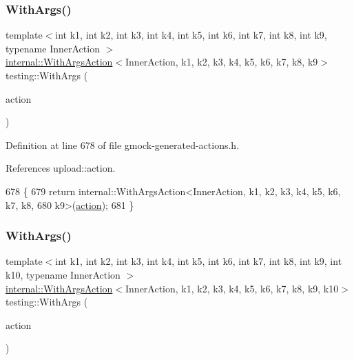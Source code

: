 \subsubsection{\texorpdfstring{With\+Args()}{WithArgs()}\hspace{0.1cm}{\footnotesize\ttfamily [9/10]}}
{\footnotesize\ttfamily template$<$int k1, int k2, int k3, int k4, int k5, int k6, int k7, int k8, int k9, typename Inner\+Action $>$ \\
\hyperlink{classtesting_1_1internal_1_1WithArgsAction}{internal\+::\+With\+Args\+Action}$<$Inner\+Action, k1, k2, k3, k4, k5, k6, k7, k8, k9$>$ testing\+::\+With\+Args (\begin{DoxyParamCaption}\item[{const Inner\+Action \&}]{action }\end{DoxyParamCaption})\hspace{0.3cm}{\ttfamily [inline]}}



Definition at line 678 of file gmock-\/generated-\/actions.\+h.



References upload\+::action.


\begin{DoxyCode}
678                                     \{
679   \textcolor{keywordflow}{return} internal::WithArgsAction<InnerAction, k1, k2, k3, k4, k5, k6, k7, k8,
680       k9>(\hyperlink{namespaceupload_a675d13c979f1c720866d22ed1736f580}{action});
681 \}
\end{DoxyCode}
\mbox{\label{namespacetesting_a768a620ad07c6b5822201fa4f15fb4f0}} 
\subsubsection{\texorpdfstring{With\+Args()}{WithArgs()}\hspace{0.1cm}{\footnotesize\ttfamily [10/10]}}
{\footnotesize\ttfamily template$<$int k1, int k2, int k3, int k4, int k5, int k6, int k7, int k8, int k9, int k10, typename Inner\+Action $>$ \\
\hyperlink{classtesting_1_1internal_1_1WithArgsAction}{internal\+::\+With\+Args\+Action}$<$Inner\+Action, k1, k2, k3, k4, k5, k6, k7, k8, k9, k10$>$ testing\+::\+With\+Args (\begin{DoxyParamCaption}\item[{const Inner\+Action \&}]{action }\end{DoxyParamCaption})\hspace{0.3cm}{\ttfamily [inline]}}



